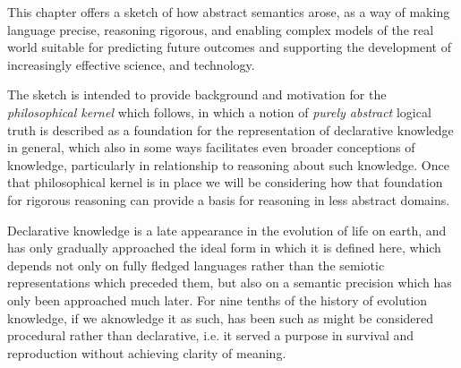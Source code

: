 This chapter offers a sketch of how abstract semantics arose, as a way of making language precise, reasoning rigorous, and enabling complex models of the real world suitable for predicting future outcomes and supporting the development of increasingly effective science, and technology.

The sketch is intended to provide background and motivation for the \emph{philosophical kernel} which follows, in which a notion of \emph{purely abstract} logical truth is described as a foundation for the representation of declarative knowledge in general, which also in some ways facilitates even broader conceptions of knowledge, particularly in relationship to reasoning about such knowledge.
Once that philosophical kernel is in place we will be considering how that foundation for rigorous reasoning can provide a basis for reasoning in less abstract domains.

Declarative knowledge is a late appearance in the evolution of life on earth, and has only gradually approached the ideal form in which it is defined here, which depends not only on fully fledged languages rather than the semiotic representations which preceded them, but also on a semantic precision which has only been approached much later.
For nine tenths of the history of evolution knowledge, if we aknowledge it as such, has been such as might be considered procedural rather than declarative, i.e. it served a purpose in survival and reproduction without achieving clarity of meaning.
